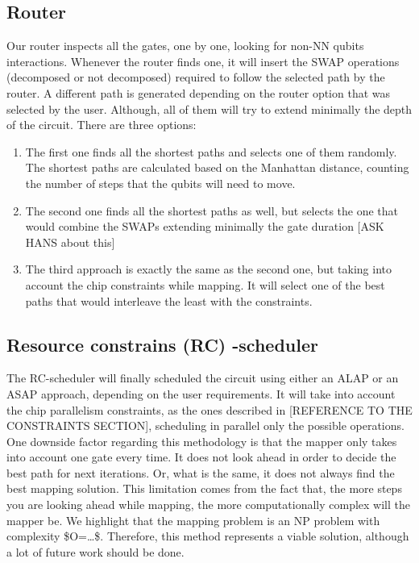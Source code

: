 \subsection*{Router}
\label{sec:org9bf8cda}

Our router inspects all the gates, one by one, looking for non-NN qubits interactions.
Whenever the router finds one, it will insert the SWAP operations (decomposed or not decomposed) required to follow the selected path by the router.
A different path is generated depending on the router option that was selected by the user.
Although, all of them will try to extend minimally the depth of the circuit.
There are three options:

\begin{enumerate}
\item The first one finds all the shortest paths and selects one of them randomly. The shortest paths are calculated based on the Manhattan distance, counting the number of steps that the qubits will need to move.
\item The second one finds all the shortest paths as well, but selects the one that would combine the SWAPs extending minimally the gate duration [ASK HANS about this]
\item The third approach is exactly the same as the second one, but taking into account the chip constraints while mapping. It will select one of the best paths that would interleave the least with the constraints.
\end{enumerate}


\subsection*{Resource constrains (RC) -scheduler}
\label{sec:orgaa2a40c}

The RC-scheduler will finally scheduled the circuit using either an ALAP or an ASAP approach, depending on the user requirements.
It will take into account the chip parallelism constraints, as the ones described in [REFERENCE TO THE CONSTRAINTS SECTION], scheduling in parallel only the possible operations.
One downside factor regarding this methodology is that the mapper only takes into account one gate every time.
It does not look ahead in order to decide the best path for next iterations.
Or, what is the same, it does not always find the best mapping solution.
This limitation comes from the fact that, the more steps you are looking ahead while mapping, the more computationally complex will the mapper be.
We highlight that the mapping problem is an NP problem with complexity \$O=\ldots{}\$.
Therefore, this method represents a viable solution, although a lot of future work should be done.

